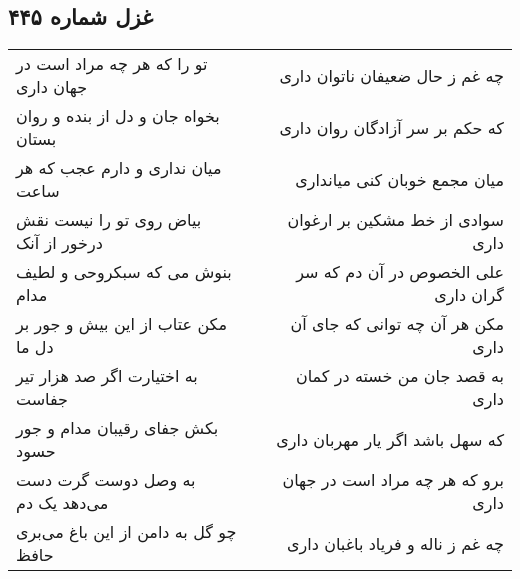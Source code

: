 \begin{center}
\section*{غزل شماره ۴۴۵}
\label{sec:sh445}
\begin{longtable}{l p{0.5cm} r}
تو را که هر چه مراد است در جهان داری
&&
چه غم ز حال ضعیفان ناتوان داری
\\
بخواه جان و دل از بنده و روان بستان
&&
که حکم بر سر آزادگان روان داری
\\
میان نداری و دارم عجب که هر ساعت
&&
میان مجمع خوبان کنی میانداری
\\
بیاض روی تو را نیست نقش درخور از آنک
&&
سوادی از خط مشکین بر ارغوان داری
\\
بنوش می که سبکروحی و لطیف مدام
&&
علی الخصوص در آن دم که سر گران داری
\\
مکن عتاب از این بیش و جور بر دل ما
&&
مکن هر آن چه توانی که جای آن داری
\\
به اختیارت اگر صد هزار تیر جفاست
&&
به قصد جان من خسته در کمان داری
\\
بکش جفای رقیبان مدام و جور حسود
&&
که سهل باشد اگر یار مهربان داری
\\
به وصل دوست گرت دست می‌دهد یک دم
&&
برو که هر چه مراد است در جهان داری
\\
چو گل به دامن از این باغ می‌بری حافظ
&&
چه غم ز ناله و فریاد باغبان داری
\\
\end{longtable}
\end{center}
